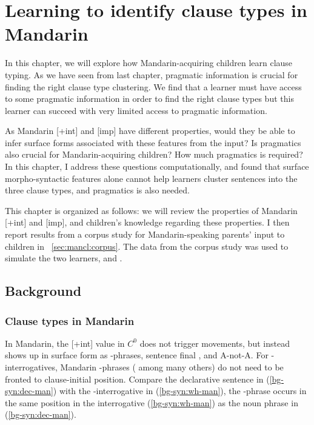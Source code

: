 \chapter{Learning to identify clause types in Mandarin}
\label{chap:man-cl}

In this chapter, we will explore how Mandarin-acquiring children learn clause typing. As we have seen from last chapter, pragmatic information is crucial for finding the right clause type clustering. We find that a learner must have access to some pragmatic information in order to find the right clause types but this learner can succeed with very limited access to pragmatic information. 

As Mandarin [+int] and [imp] have different properties, would they be able to infer surface forms associated with these features from the input? Is pragmatics also crucial for Mandarin-acquiring children? How much pragmatics is required? In this chapter, I address these questions computationally, and found that surface morpho-syntactic features alone cannot help learners cluster sentences into the three clause types, and pragmatics is also needed. 

This chapter is organized as follows: we will review the properties of Mandarin [+int] and [imp], and children's knowledge regarding these properties. I then report results from a corpus study for Mandarin-speaking parents' input to children in  ~\ref{sec:mancl:corpus}. The data from the corpus study was used to simulate the two learners, \distlearner{} and \praglearner{}.  %

\section{Background}
\label{sec:mancl:bg}
\subsection{Clause types in Mandarin}
\label{sec:mancl:bg:theory}


In Mandarin, the [+int] value in $C^{0}$ does not trigger movements, but instead shows up in surface form as \twh-phrases, sentence final , and A-not-A. For \twh-interrogatives, Mandarin \twh-phrases (\citealt{huang1982, cheng1991} among many others) do not need to be fronted to clause-initial position. Compare the declarative sentence in (\ref{bg-syn:dec-man}) with the \twh-interrogative in (\ref{bg-syn:wh-man}), the \twh-phrase  occurs in the same position in the interrogative (\ref{bg-syn:wh-man}) as the noun phrase  in (\ref{bg-syn:dec-man}). 


